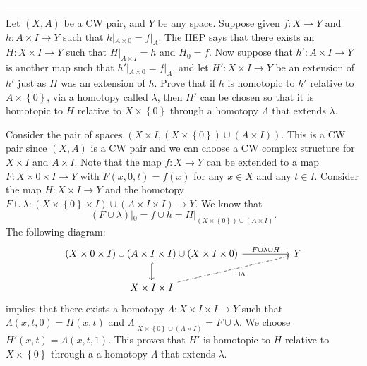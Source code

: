 \documentclass[a4paper, 12pt]{article}
\begin{document}
\noindent\rule{7in}{2.8pt}
\begin{problem}{7}
Let \((X,A)\) be a CW pair, and \(Y\) be any space. Suppose given \(f:X\rightarrow Y\) and \(h:A\times I\rightarrow Y\) such that \(h|_{A\times 0}=f|_A\). The HEP says that 
there exists an \(H:X\times I\rightarrow Y\) such that \(H|_{A\times I}=h\) and \(H_0=f\). Now suppose that \(h':A\times I\rightarrow Y\) is another map such that \(h'|_{A\times 0}=f|_A\), and let 
\(H':X\times I\rightarrow Y\) be an extension of \(h'\) just as \(H\) was an extension of \(h\). Prove that if \(h\) is homotopic to \(h'\) relative to \(A\times \left\{ 0 \right\}\), via a homotopy called \(\lambda\), then 
\(H'\) can be chosen so that it is homotopic to \(H\) relative to \(X\times \left\{ 0 \right\}\) through a homotopy \(\Lambda\) that extends \(\lambda\).
\end{problem}
\begin{solution}
Consider the pair of spaces \((X\times I, (X\times \left\{ 0 \right\})\cup(A\times I))\). This is a CW pair since \((X,A)\) is a CW pair and we can choose a CW complex structure for \(X\times I\) and \(A\times I\). Note 
that the map \(f:X\rightarrow Y\) can be extended to a map \(F:X\times 0\times I\rightarrow Y\) with \(F(x,0,t)=f(x)\) for any \(x\in X\) and any \(t\in I\). Consider the map 
\(H:X\times I\rightarrow Y\) and the homotopy \(F\cup \lambda: (X\times \left\{ 0 \right\}\times I)\cup (A\times I\times I)\rightarrow Y\). We know that 
\[(F\cup \lambda)|_0=f\cup h=H|_{(X\times \left\{ 0 \right\})\cup (A\times I)}.\]
The following diagram:
\[\begin{tikzcd}
	{(X\times 0\times I)\cup(A\times I\times I)\cup(X\times I\times 0)} && Y \\
	{X\times I\times I}
	\arrow["{F\cup \lambda\cup H}", from=1-1, to=1-3]
	\arrow[hook, from=1-1, to=2-1]
	\arrow["{\exists \Lambda}"', dashed, from=2-1, to=1-3]
\end{tikzcd}\]
implies that there exists a homotopy \(\Lambda:X\times I\times I\rightarrow Y\) such that \(\Lambda(x,t,0)=H(x,t)\) and \(\Lambda|_{X\times \left\{ 0 \right\}\cup (A\times I)}=F\cup \lambda\). We choose \(H'(x,t)=\Lambda(x,t,1)\). 
This proves that \(H'\) is homotopic to \(H\) relative to \(X\times \left\{ 0 \right\}\) through a a homotopy \(\Lambda\) that extends \(\lambda\).
\end{solution}
\end{document}
